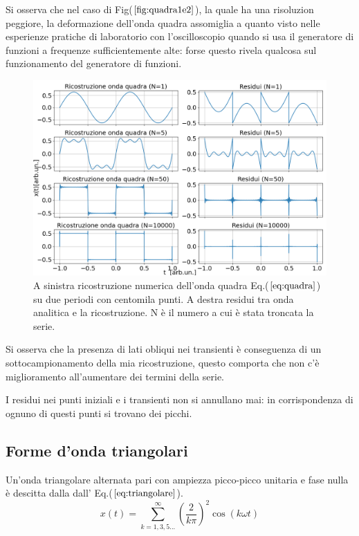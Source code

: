 \documentclass{article}
\begin{document}
        Si osserva che nel caso di Fig($\ref{fig:quadra1e2}$),
        la quale ha una risoluzion  peggiore, la deformazione dell'onda quadra assomiglia a quanto visto nelle esperienze 
        pratiche di laboratorio con l'oscilloscopio quando si usa il generatore di funzioni a
        frequenze sufficientemente alte: forse questo rivela qualcosa sul funzionamento del generatore
        di funzioni.\\

        \begin{figure}[H]
            \centering
            \includegraphics[width=1\textwidth]{fousquarewave1e5.png} %
            \caption{A sinistra ricostruzione numerica dell'onda quadra Eq.($\ref{eq:quadra}$) su
                    due periodi con centomila punti.
                    A destra residui tra onda analitica e la ricostruzione.
                    N è il numero a cui è stata troncata la serie.}            \label{fig:quadra1e5}
        \end{figure}  
        
        
        Si osserva che la presenza di lati obliqui nei transienti è conseguenza di un sottocampionamento
        della mia ricostruzione, questo comporta che non c'è miglioramento all'aumentare dei termini 
        della serie.

        I residui nei punti iniziali e i transienti non si annullano mai: in corrispondenza di ognuno di
        questi punti si trovano dei picchi.




    \subsection{Forme d'onda triangolari}
        Un'onda triangolare alternata pari con ampiezza picco-picco unitaria e fase nulla è descitta dalla
        dall' Eq.($\ref{eq:triangolare}$).
        \begin{equation}
            x(t) = \sum_{k=1,3,5...}^{\infty} \left(\frac{2}{k\pi}\right)^{2}\cos\left(k\omega t\right)
            \label{eq:triangolare}
        \end{equation}
\end{document}
